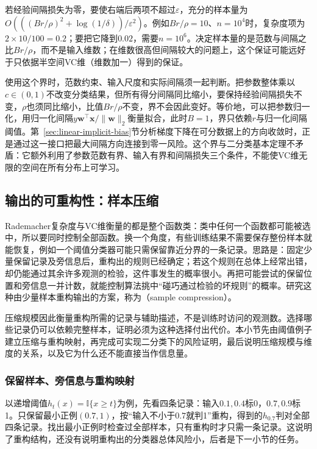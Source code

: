 若经验间隔损失为零，要使右端后两项不超过$\varepsilon$，充分的样本量为$O(((Br/\rho)^2+\log(1/\delta))/\varepsilon^2)$。例如$Br/\rho=10$、$n=10^4$时，复杂度项为$2\times10/100=0.2$；要把它降到$0.02$，需要$n=10^6$。决定样本量的是范数与间隔之比$Br/\rho$，而不是输入维数；在维数很高但间隔较大的问题上，这个保证可能远好于只依据半空间VC维（维数加一）得到的保证。

使用这个界时，范数约束、输入尺度和实际间隔须一起判断。把参数整体乘以$c\in(0,1)$不改变分类结果，但所有得分间隔同比缩小，要保持经验间隔损失不变，$\rho$也须同比缩小，比值$Br/\rho$不变，界不会因此变好。等价地，可以把参数归一化，用归一化间隔$y\bm w^\top\bm x/\|\bm w\|_2$衡量拟合，此时$B=1$，界只依赖$r$与归一化间隔阈值。第~\ref{sec:linear-implicit-bias}节分析梯度下降在可分数据上的方向收敛时，正是通过这一接口把最大间隔方向连接到零一风险。这个界与二分类基本定理不矛盾：它额外利用了参数范数有界、输入有界和间隔损失三个条件，不能使VC维无限的空间在所有分布上可学习。

\subsection{输出的可重构性：样本压缩}
\label{sec:sample-compression}

Rademacher复杂度与VC维衡量的都是整个函数类：类中任何一个函数都可能被选中，所以要同时控制全部函数。换一个角度，有些训练结果不需要保存整份样本就能恢复，例如一个阈值分类器可能只需保留靠近分界的一条记录。思路是：固定少量保留记录及旁信息后，重构出的规则已经确定；若这个规则在总体上经常出错，却仍能通过其余许多观测的检验，这件事发生的概率很小。再把可能尝试的保留位置和旁信息一并计数，就能控制算法挑中“碰巧通过检验的坏规则”的概率。研究这种由少量样本重构输出的方案，称为（sample compression）。

压缩规模因此衡量重构所需的记录与辅助描述，不是训练时访问的观测数。选择哪些记录仍可以依赖完整样本，证明必须为这种选择付出代价。本小节先由阈值例子建立压缩与重构映射，再完成可实现二分类下的风险证明，最后说明压缩规模与维度的关系，以及它为什么还不能直接当作信息量。

\subsubsection{保留样本、旁信息与重构映射}

以递增阈值$h_t(x)=\mathbb I\{x\geq t\}$为例，先看四条记录：输入$0.1,0.4$标0，$0.7,0.9$标1。只保留最小正例$(0.7,1)$，按“输入不小于$0.7$就判1”重构，得到的$h_{0.7}$判对全部四条记录。找出最小正例时检查过全部样本，只有重构时才只需一条记录。这说明了重构结构，还没有说明重构出的分类器总体风险小，后者是下一小节的任务。

